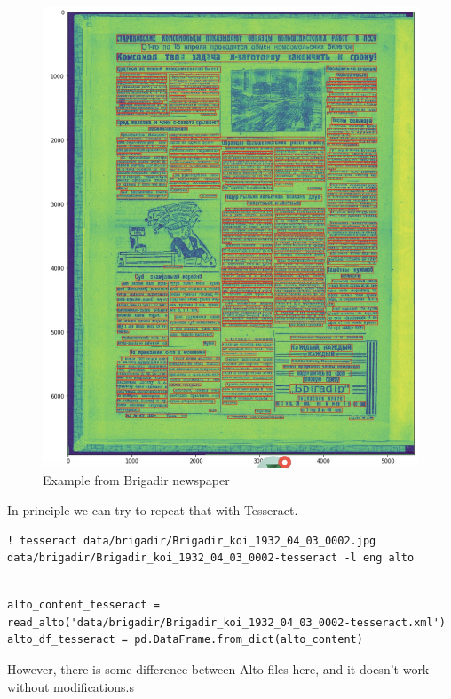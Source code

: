\documentclass[]{book}
\begin{document}
\begin{figure}
\centering
\includegraphics{images/brigadir_lines.jpg}
\caption{Example from Brigadir newspaper}
\end{figure}

In principle we can try to repeat that with Tesseract.

\begin{verbatim}
! tesseract data/brigadir/Brigadir_koi_1932_04_03_0002.jpg data/brigadir/Brigadir_koi_1932_04_03_0002-tesseract -l eng alto
\end{verbatim}

\begin{verbatim}

alto_content_tesseract = read_alto('data/brigadir/Brigadir_koi_1932_04_03_0002-tesseract.xml')
alto_df_tesseract = pd.DataFrame.from_dict(alto_content)
\end{verbatim}

However, there is some difference between Alto files here, and it doesn't work without modifications.s
\end{document}
